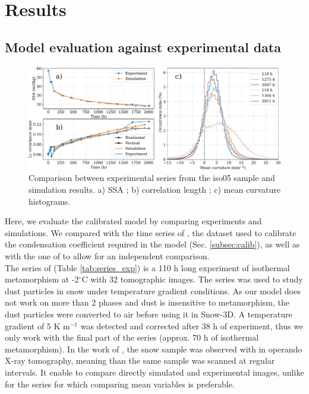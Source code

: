 \documentclass[draft,ms]{agujournal2019}
\begin{document}
\section{Results}

\subsection{Model evaluation against experimental data}
\label{Section:Calibration}

\begin{figure}
    \centering
    \includegraphics[width=\linewidth]{Figures/flin_evaluation_courbes_lc_ssa_histo.pdf}
    \caption{Comparison between \protect{} experimental series from the iso05 sample and simulation results. a) SSA ; b) correlation length ; c) mean curvature histograms.}
    \label{fig:flin_evaluation}
\end{figure}

Here, we evaluate the calibrated model by comparing experiments and simulations. We compared with the time series of , the dataset used to calibrate the condensation coefficient required in the model (Sec. \ref{subsec:calib}), as well as with the one of  to allow for an independent comparison.\\

The series of  (Table \ref{tab:series_exp}) is a 110 h long experiment of isothermal metamorphism at -2$^\circ$C with 32 tomographic images. The series was used to study dust particles in snow under temperature gradient conditions. As our model does not work on more than 2 phases and dust is insensitive to metamorphism, the dust particles were converted to air before using it in Snow-3D. A temperature gradient of 5 K m$^{-1}$ was detected and corrected after 38 h of experiment, thus we only work with the final part of the series (approx. 70 h of isothermal metamorphism). In the work of , the snow sample was observed with in operando X-ray tomography, meaning than the same sample was scanned at regular intervals. It enable to compare directly simulated and experimental images, unlike for the  series for which comparing mean variables is preferable.\\
\end{document}
